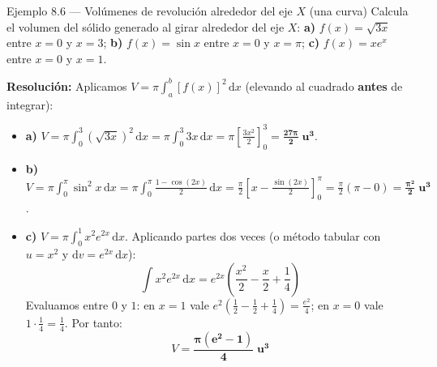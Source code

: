 \documentclass[10pt,a4paper]{article}
\begin{document}
\begin{ejemplobox}{Ejemplo 8.6 --- Volúmenes de revolución alrededor del eje $X$ (una curva)}
Calcula el volumen del sólido generado al girar alrededor del eje $X$: \quad
\textbf{a)} $f(x) = \sqrt{3x}$ entre $x = 0$ y $x = 3$; \qquad \textbf{b)} $f(x) = \sin x$ entre $x = 0$ y $x = \pi$; \qquad \textbf{c)} $f(x) = x e^x$ entre $x = 0$ y $x = 1$.
\par\textbf{Resolución:} Aplicamos $V = \pi \int_a^b [f(x)]^2\,\mathrm{d}x$ (elevando al cuadrado \textbf{antes} de integrar):
\begin{itemize}\itemsep 4pt
  \item \textbf{a)} $V = \pi \int_0^3 (\sqrt{3x})^2\,\mathrm{d}x = \pi \int_0^3 3x\,\mathrm{d}x = \pi\left[\frac{3x^2}{2}\right]_0^3 = \mathbf{\frac{27\pi}{2}\;\text{u}^3}$.

  \item \textbf{b)} $V = \pi \int_0^\pi \sin^2 x\,\mathrm{d}x = \pi \int_0^\pi \frac{1 - \cos(2x)}{2}\,\mathrm{d}x = \frac{\pi}{2}\left[x - \frac{\sin(2x)}{2}\right]_0^\pi = \frac{\pi}{2}(\pi - 0) = \mathbf{\frac{\pi^2}{2}\;\text{u}^3}$.

  \item \textbf{c)} $V = \pi \int_0^1 x^2 e^{2x}\,\mathrm{d}x$. Aplicando partes dos veces (o método tabular con $u = x^2$ y $\mathrm{d}v = e^{2x}\,\mathrm{d}x$):
  $$\int x^2 e^{2x}\,\mathrm{d}x = e^{2x}\left(\frac{x^2}{2} - \frac{x}{2} + \frac{1}{4}\right)$$
  Evaluamos entre $0$ y $1$: en $x=1$ vale $e^2(\frac{1}{2} - \frac{1}{2} + \frac{1}{4}) = \frac{e^2}{4}$; en $x=0$ vale $1\cdot\frac{1}{4} = \frac{1}{4}$. Por tanto:
  $$V = \mathbf{\frac{\pi(e^2 - 1)}{4}\;\text{u}^3}$$
\end{itemize}
\end{ejemplobox}
\end{document}
